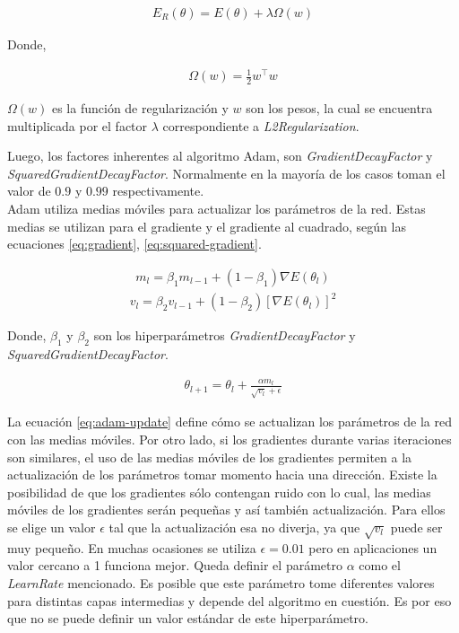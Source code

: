 \begin{align} \label{eq:l2-regularization}
    E_R(\theta) = E(\theta) + \lambda \Omega(w)
\end{align}

Donde,

\begin{align}
    \Omega(w) = \frac{1}{2} w^\top w
\end{align}

\indent $\Omega(w)$ es la función de regularización y $w$ son los pesos, la cual se encuentra multiplicada por el factor $\lambda$ correspondiente a \textit{L2Regularization}. \bigskip

\indent Luego, los factores inherentes al algoritmo Adam, son \textit{GradientDecayFactor} y \textit{SquaredGradientDecayFactor}. Normalmente en la mayoría de los casos toman el valor de $0.9$ y $0.99$ respectivamente. \\
\indent Adam utiliza medias móviles para actualizar los parámetros de la red. Estas medias se utilizan para el gradiente y el gradiente al cuadrado, según las ecuaciones \ref{eq:gradient}, \ref{eq:squared-gradient}.

\begin{align} \label{eq:gradient}
    m_l = \beta_1 m_{l-1} + (1-\beta_1) \nabla E(\theta_l)
\end{align}
\begin{align} \label{eq:squared-gradient}
    v_l = \beta_2 v_{l-1} + (1-\beta_2) [\nabla E(\theta_l)]^2
\end{align}

Donde, $\beta_1$ y $\beta_2$ son los hiperparámetros \textit{GradientDecayFactor} y \textit{SquaredGradientDecayFactor}.

\begin{align} \label{eq:adam-update}
    \theta_{l+1} = \theta_l + \frac{\alpha m_l}{\sqrt{v_l}+\epsilon}
\end{align}

\indent La ecuación \ref{eq:adam-update} define cómo se actualizan los parámetros de la red con las medias móviles. Por otro lado, si los gradientes durante varias iteraciones son similares, el uso de las medias móviles de los gradientes permiten a la actualización de los parámetros tomar momento hacia una dirección. Existe la posibilidad de que los gradientes sólo contengan ruido con lo cual, las medias móviles de los gradientes serán pequeñas y así también actualización. Para ellos se elige un valor $\epsilon$ tal que la actualización esa no diverja, ya que $\sqrt{v_l}$ puede ser muy pequeño. En muchas ocasiones se utiliza $\epsilon = 0.01$ pero en aplicaciones un valor cercano a 1 funciona mejor. Queda definir el parámetro $\alpha$ como el \textit{LearnRate} mencionado. Es posible que este parámetro tome diferentes valores para distintas capas intermedias y depende del algoritmo en cuestión. Es por eso que no se puede definir un valor estándar de este hiperparámetro. \bigskip

